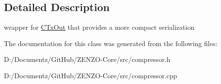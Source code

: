 \subsection{Detailed Description}
wrapper for \mbox{\hyperlink{class_c_tx_out}{C\+Tx\+Out}} that provides a more compact serialization 

The documentation for this class was generated from the following files\+:\begin{DoxyCompactItemize}
\item 
D\+:/\+Documentz/\+Git\+Hub/\+Z\+E\+N\+Z\+O-\/\+Core/src/compressor.\+h\item 
D\+:/\+Documentz/\+Git\+Hub/\+Z\+E\+N\+Z\+O-\/\+Core/src/compressor.\+cpp\end{DoxyCompactItemize}
